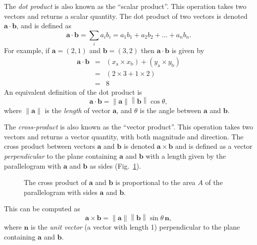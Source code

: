 \documentclass[a4paper]{article}
\newcommand{\bvec}[1]{\mathbf{#1}}
\newcommand{\norm}[1]{\left\lVert #1\right\rVert}
\begin{document}
The \emph{dot product} is also known as the ``scalar product''. This operation takes two vectors and returns a scalar quantity. The dot product of two vectors is denoted $\bvec{a}\cdot\bvec{b}$, and is defined as
\begin{equation*}
\bvec{a}\cdot\bvec{b} = \sum_ia_ib_i = a_1b_1 + a_2b_2 + \ldots + a_nb_n.
\end{equation*}
For example, if $\bvec{a}=(2,1)$ and $\bvec{b}=(3,2)$ then $\bvec{a}\cdot\bvec{b}$ is given by
\begin{eqnarray*}
\bvec{a}\cdot\bvec{b} & = & (x_\mathrm{a} \times x_\mathrm{b})+ (y_\mathrm{a}\times y_\mathrm{b})\\
& = & (2\times3 + 1\times2) \\
& = & 8
\end{eqnarray*}
An equivalent definition of the dot product is
\begin{equation*}
\bvec{a}\cdot\bvec{b} = \norm{\bvec{a}}\norm{\bvec{b}}\cos\theta,
\end{equation*}
where $\norm{\bvec{a}}$ is the \emph{length} of vector $\bvec{a}$, and $\theta$ is the angle between $\bvec{a}$ and $\bvec{b}$.

The \emph{cross-product} is also known as the ``vector product''. This operation takes two vectors and returns a vector quantity, with both magnitude and direction. The cross product between vectors $\bvec{a}$ and $\bvec{b}$ is denoted $\bvec{a}\times\bvec{b}$ and is defined as a vector \emph{perpendicular} to the plane containing $\bvec{a}$ and $\bvec{b}$ with a length given by the parallelogram with $\bvec{a}$ and $\bvec{b}$ as sides (Fig.~\ref{fig:cross_product}). 
\begin{figure}[tb]
  \centering
    \caption{\label{fig:cross_product}The cross product of $\bvec{a}$ and $\bvec{b}$ is proportional to the area $A$ of the parallelogram with sides $\bvec{a}$ and $\bvec{b}$.}
\end{figure}
This can be computed as
\begin{equation*}
\bvec{a}\times\bvec{b} = \norm{\bvec{a}}\norm{\bvec{b}}\sin\theta\,\bvec{n},
\end{equation*}
where $\bvec{n}$ is the \emph{unit vector} (a vector with length 1) perpendicular to the plane containing $\bvec{a}$ and $\bvec{b}$.
\end{document}
